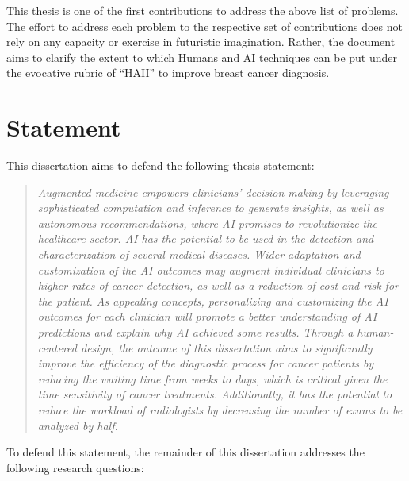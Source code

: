 This thesis is one of the first contributions to address the above list of problems.
The effort to address each problem to the respective set of contributions does not rely on any capacity or exercise in futuristic imagination.
Rather, the document aims to clarify the extent to which Humans and \ac{AI} techniques can be put under the evocative rubric of ``\ac{HAII}'' to improve breast cancer diagnosis.

\section{Statement}
\label{sec:chap001003}

\noindent
This dissertation aims to defend the following thesis statement:

\begin{quote}
{\it
Augmented medicine empowers clinicians' decision-making by leveraging sophisticated computation and inference to generate insights, as well as autonomous recommendations, where \ac{AI} promises to revolutionize the healthcare sector.
\ac{AI} has the potential to be used in the detection and characterization of several medical diseases.
Wider adaptation and customization of the \ac{AI} outcomes may augment individual clinicians to higher rates of cancer detection, as well as a reduction of cost and risk for the patient.
As appealing concepts, personalizing and customizing the \ac{AI} outcomes for each clinician will promote a better understanding of \ac{AI} predictions and explain why \ac{AI} achieved some results.
Through a human-centered design, the outcome of this dissertation aims to significantly improve the efficiency of the diagnostic process for cancer patients by reducing the waiting time from weeks to days, which is critical given the time sensitivity of cancer treatments.
Additionally, it has the potential to reduce the workload of radiologists by decreasing the number of exams to be analyzed by half.
}
\end{quote}

\noindent
To defend this statement, the remainder of this dissertation addresses the following research questions:

